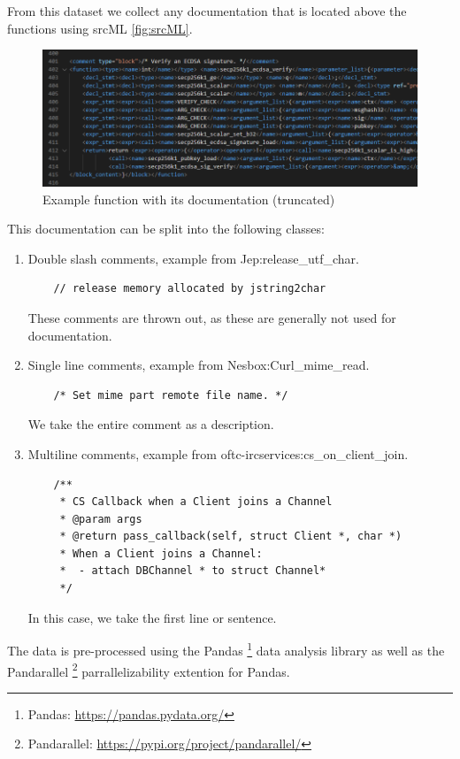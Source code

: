 From this dataset we collect any documentation that is located above the functions using srcML \ref{fig:srcML}. 
\label{fig:srcML}
\begin{figure}[H]
  \centering
  \includegraphics[width=\linewidth]{img/srcML.png}
  \caption{Example function with its documentation (truncated)}
\end{figure}

This documentation can be split into the following classes: 
\begin{enumerate}
  \item Double slash comments, example from Jep:release\_utf\_char. 
\begin{verbatim}
    // release memory allocated by jstring2char
\end{verbatim}
    These comments are thrown out, as these are generally not used for documentation.
  \item Single line comments, example from Nesbox:Curl\_mime\_read.
\begin{verbatim}
    /* Set mime part remote file name. */
\end{verbatim}
   We take the entire comment as a description.
  \item Multiline comments, example from oftc-ircservices:cs\_on\_client\_join.
\begin{verbatim}
    /**
     * CS Callback when a Client joins a Channel
     * @param args 
     * @return pass_callback(self, struct Client *, char *)
     * When a Client joins a Channel:
     *  - attach DBChannel * to struct Channel*
     */
\end{verbatim}
    In this case, we take the first line or sentence.
\end{enumerate}



The data is pre-processed using the Pandas \footnote{Pandas: \url{https://pandas.pydata.org/}} data analysis library as well as the Pandarallel \footnote{Pandarallel: \url{https://pypi.org/project/pandarallel/}} parrallelizability extention for Pandas.

